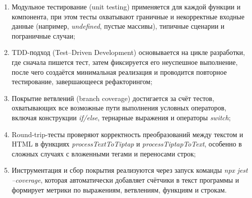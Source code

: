\begin{enumerate}
  \item Модульное тестирование (unit testing) применяется для каждой функции и компонента, при этом тесты охватывают граничные и некорректные входные данные (например, \textit{undefined}, пустые массивы), типичные сценарии и пограничные случаи;
  \item TDD-подход (Test–Driven Development) основывается на цикле разработки, где сначала пишется тест, затем фиксируется его неуспешное выполнение, после чего создаётся минимальная реализация и проводится повторное тестирование, завершающееся рефакторингом;
  \item Покрытие ветвлений (branch coverage) достигается за счёт тестов, охватывающих все возможные пути выполнения условных операторов, включая конструкции \textit{if/else}, тернарные выражения и операторы \textit{switch};
  \item Round-trip-тесты проверяют корректность преобразований между текстом и HTML в функциях \textit{processTextToTiptap} и \textit{processTiptapToText}, особенно в сложных случаях с вложенными тегами и переносами строк;
  \item Инструментация и сбор покрытия реализуются через запуск команды \textit{npx jest --coverage}, которая автоматически добавляет счётчики в текст программы и формирует метрики по выражениям, ветвлениям, функциям и строкам.
\end{enumerate}

